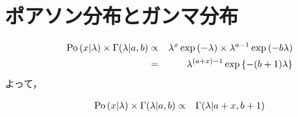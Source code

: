 \documentclass[a4j]{jarticle}
\begin{document}
\section{ポアソン分布とガンマ分布}
\begin{eqnarray}
\operatorname{\rm Po}{(x | \lambda)} \times \Gamma(\lambda | a, b)
&\propto& \lambda^x \exp{(-\lambda)} \times \lambda^{a-1} \exp{(-b \lambda)}\\
&=& \lambda^{(a+x)-1} \exp{\left\{ -(b + 1) \lambda \right\}}
\end{eqnarray}
よって，
\begin{screen}
\begin{eqnarray}
\operatorname{\rm Po}{(x | \lambda)} \times \Gamma(\lambda | a, b)
&\propto&
\Gamma(\lambda | a + x, b + 1)
\end{eqnarray}
\end{screen}
\end{document}
